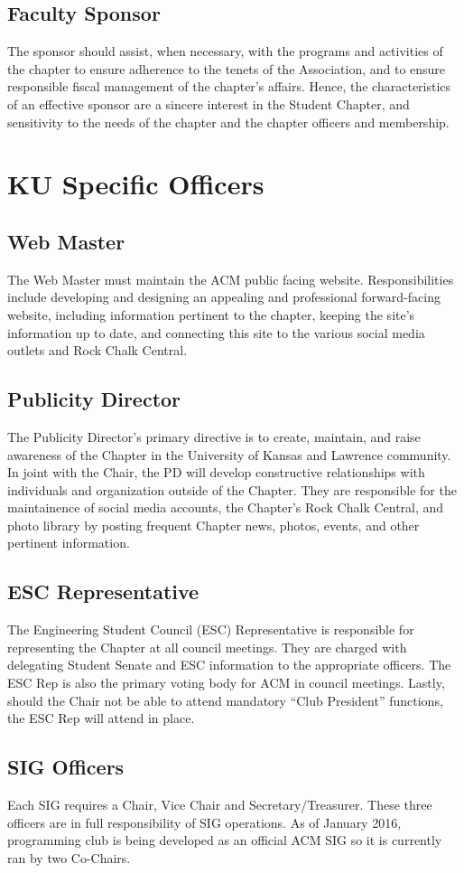 \subsection*{Faculty Sponsor}
The sponsor should assist, when necessary, with the programs and activities of the chapter to ensure adherence to the tenets of the Association, and to ensure responsible fiscal management of the chapter's affairs. Hence, the characteristics of an effective sponsor are a sincere interest in the Student Chapter, and sensitivity to the needs of the chapter and the chapter officers and membership.
\section*{KU Specific Officers}
\subsection*{Web Master}
The Web Master must maintain the ACM public facing website. Responsibilities
include developing and designing an appealing and professional forward-facing website, including information pertinent to the chapter, keeping the site’s information up to date, and connecting this site to the various social media outlets and Rock Chalk Central.
\subsection*{Publicity Director}
The Publicity Director's primary directive is to create, maintain, and raise awareness of the Chapter in the University of Kansas and Lawrence community. In joint with the Chair, the PD will develop constructive relationships with individuals and organization outside of the Chapter. They are responsible for the maintainence of social media accounts, the Chapter's Rock Chalk Central, and photo library by posting frequent Chapter news, photos, events, and other pertinent information.
\subsection*{ESC Representative}
The Engineering Student Council (ESC) Representative is responsible for representing the Chapter at all council meetings. They are charged with delegating Student Senate and ESC information to the appropriate officers.  The ESC Rep is also the primary voting body for ACM in council meetings. Lastly, should the Chair not be able to attend mandatory “Club President” functions, the ESC Rep will attend in place.
\subsection*{SIG Officers}
Each SIG requires a Chair, Vice Chair and Secretary/Treasurer. These three officers are in full responsibility of SIG operations. As of January 2016, programming club is being developed as an official ACM SIG so it is currently ran by two Co-Chairs.

